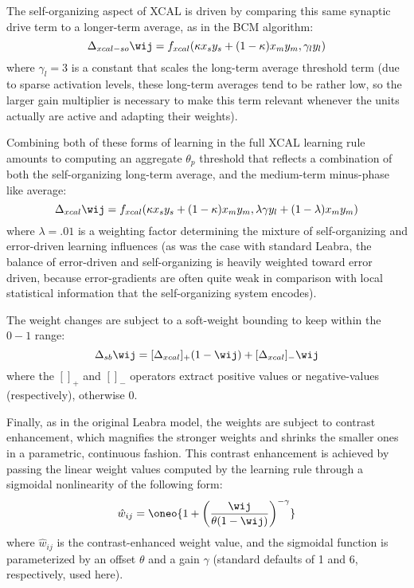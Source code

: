 The self-organizing aspect of XCAL is driven by comparing this same synaptic drive term to a longer-term average, as in the BCM algorithm:
\begin{equation}
 \Delta_{xcal-so} \wij = f_{xcal} ( \kappa x_s y_s + (1-\kappa) x_m y_m, \gamma_l y_l)
 \label{eq.xcal-selforg}
\end{equation}
where $\gamma_l = 3$ is a constant that scales the long-term average threshold term (due to sparse activation levels, these long-term averages tend to be rather low, so the larger gain multiplier is necessary to make this term relevant whenever the units actually are active and adapting their weights).

Combining both of these forms of learning in the full XCAL learning rule amounts to computing an aggregate $\theta_p$ threshold that reflects a combination of both the self-organizing long-term average, and the medium-term minus-phase like average:
\begin{equation}
 \Delta_{xcal} \wij = f_{xcal} ( \kappa x_s y_s + (1-\kappa) x_m y_m, \lambda
 \gamma y_l + (1-\lambda) x_m y_m)
 \label{eq.xcal}
\end{equation}
where $\lambda = .01$ is a weighting factor determining the mixture of self-organizing and error-driven learning influences (as was the case with standard Leabra, the balance of error-driven and self-organizing is heavily weighted toward error driven, because error-gradients are often quite weak in comparison with local statistical information that the self-organizing system encodes).

The weight changes are subject to a soft-weight bounding to keep within the $0-1$ range:
\begin{equation}
 \Delta_{sb} \wij = [\Delta_{xcal}]_+ (1-\wij) + [\Delta_{xcal}]_- \wij
 \label{eq.err_soft_bound}
\end{equation}
where the $[]_+$ and $[]_-$ operators extract positive values or negative-values (respectively), otherwise 0.

Finally, as in the original Leabra model, the weights are subject to contrast enhancement, which magnifies the stronger weights and shrinks the smaller ones in a parametric, continuous fashion. This contrast enhancement is achieved by passing the linear weight values computed by the learning rule through a sigmoidal nonlinearity of the following form:
\begin{equation}
 \hat{w}_{ij} = \oneo{1 + \left(\frac{\wij}{\theta (1-\wij)}\right)^{-\gamma}}
 \label{eq.wt_off}
\end{equation}
where $\hat{w}_{ij}$ is the contrast-enhanced weight value, and the sigmoidal function is parameterized by an offset $\theta$ and a gain $\gamma$ (standard defaults of 1 and 6, respectively, used here). 

